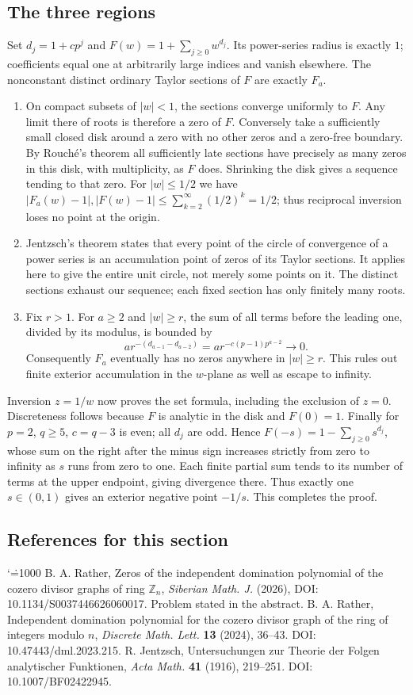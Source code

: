 \documentclass[11pt,a4paper]{article}
\makeatletter
\numberwithin{equation}{section}
\theoremstyle{definition}
\theoremstyle{remark}
\renewenvironment{thebibliography}[1]
 {\subsection*{References for this section}\small
  \list{\@biblabel{\@arabic\c@enumiv}}
       {\settowidth\labelwidth{\@biblabel{#1}}\leftmargin\labelwidth
        \advance\leftmargin\labelsep\@openbib@code
        \usecounter{enumiv}\let\p@enumiv\@empty
        \renewcommand\theenumiv{\@arabic\c@enumiv}}
  \sloppy\clubpenalty4000\widowpenalty4000\sfcode`\.=1000\relax}
 {\def\@noitemerr{\@latex@warning{Empty bibliography}}\endlist}
\makeatother
\begin{document}
\subsection{The three regions}
Set $d_j=1+cp^j$ and $F(w)=1+\sum_{j\ge0}w^{d_j}$. Its power-series radius is exactly $1$; coefficients equal one at arbitrarily large indices and vanish elsewhere. The nonconstant distinct ordinary Taylor sections of $F$ are exactly $F_a$.
\begin{enumerate}
\item On compact subsets of $|w|<1$, the sections converge uniformly to $F$. Any limit there of roots is therefore a zero of $F$. Conversely take a sufficiently small closed disk around a zero with no other zeros and a zero-free boundary. By Rouch\'e's theorem all sufficiently late sections have precisely as many zeros in this disk, with multiplicity, as $F$ does. Shrinking the disk gives a sequence tending to that zero. For $|w|\le1/2$ we have $|F_a(w)-1|,|F(w)-1|\le\sum_{k=2}^\infty (1/2)^k=1/2$; thus reciprocal inversion loses no point at the origin.
\item Jentzsch's theorem \cite{r42reiwa:J} states that every point of the circle of convergence of a power series is an accumulation point of zeros of its Taylor sections. It applies here to give the entire unit circle, not merely some points on it. The distinct sections exhaust our sequence; each fixed section has only finitely many roots.
\item Fix $r>1$. For $a\ge2$ and $|w|\ge r$, the sum of all terms before the leading one, divided by its modulus, is bounded by
\[
 a r^{-(d_{a-1}-d_{a-2})}
   =a r^{-c(p-1)p^{a-2}}\longrightarrow0.
\]
Consequently $F_a$ eventually has no zeros anywhere in $|w|\ge r$. This rules out finite exterior accumulation in the $w$-plane as well as escape to infinity.
\end{enumerate}
Inversion $z=1/w$ now proves the set formula, including the exclusion of $z=0$. Discreteness follows because $F$ is analytic in the disk and $F(0)=1$. Finally for $p=2$, $q\ge5$, $c=q-3$ is even; all $d_j$ are odd. Hence $F(-s)=1-\sum_{j\ge0}s^{d_j}$, whose sum on the right after the minus sign increases strictly from zero to infinity as $s$ runs from zero to one. Each finite partial sum tends to its number of terms at the upper endpoint, giving divergence there. Thus exactly one $s\in(0,1)$ gives an exterior negative point $-1/s$. This completes the proof.

\begin{thebibliography}{9}
 B. A. Rather, Zeros of the independent domination polynomial of the cozero divisor graphs of ring $\mathbb Z_n$, \emph{Siberian Math. J.} (2026), DOI: 10.1134/S0037446626060017. Problem stated in the abstract.
 B. A. Rather, Independent domination polynomial for the cozero divisor graph of the ring of integers modulo $n$, \emph{Discrete Math. Lett.} \textbf{13} (2024), 36--43. DOI: 10.47443/dml.2023.215.
 R. Jentzsch, Untersuchungen zur Theorie der Folgen analytischer Funktionen, \emph{Acta Math.} \textbf{41} (1916), 219--251. DOI: 10.1007/BF02422945.
\end{thebibliography}
\end{document}
